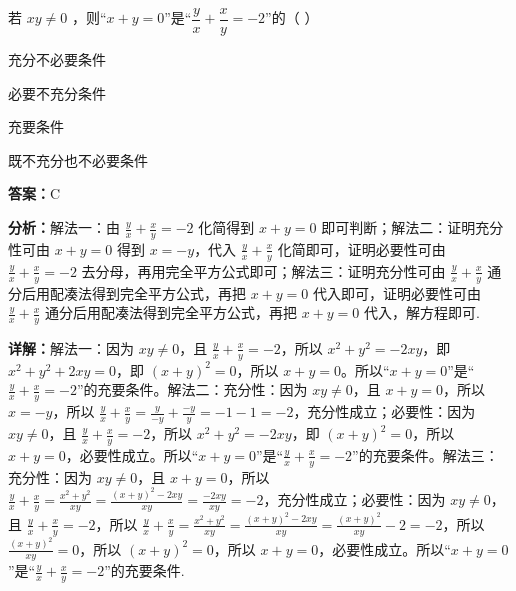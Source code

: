 \begin{question}[points=4]
若 $xy \neq 0$ ，则“$x + y = 0$”是“$\dfrac{y}{x} + \dfrac{x}{y} = -2$”的（ ）
\begin{choices}
  \item 充分不必要条件
  \item 必要不充分条件
  \item 充要条件
  \item 既不充分也不必要条件
\end{choices}
\begin{solution}
\textbf{答案：}C

\textbf{分析：}解法一：由 $\frac{y}{x} + \frac{x}{y} = -2$ 化简得到 $x+y=0$ 即可判断；解法二：证明充分性可由 $x+y=0$ 得到 $x=-y$，代入 $\frac{y}{x}+\frac{x}{y}$ 化简即可，证明必要性可由 $\frac{y}{x}+\frac{x}{y}=-2$ 去分母，再用完全平方公式即可；解法三：证明充分性可由 $\frac{y}{x}+\frac{x}{y}$ 通分后用配凑法得到完全平方公式，再把 $x+y=0$ 代入即可，证明必要性可由 $\frac{y}{x}+\frac{x}{y}$ 通分后用配凑法得到完全平方公式，再把 $x+y=0$ 代入，解方程即可.

\textbf{详解：}解法一：因为 $xy \neq 0$，且 $\frac{y}{x}+\frac{x}{y} = -2$，所以 $x^2+y^2 = -2xy$，即 $x^2+y^2+2xy=0$，即 $(x+y)^2=0$，所以 $x+y=0$。所以“$x+y=0$”是“$\frac{y}{x}+\frac{x}{y}=-2$”的充要条件。解法二：充分性：因为 $xy \neq 0$，且 $x+y=0$，所以 $x=-y$，所以 $\frac{y}{x}+\frac{x}{y} = \frac{y}{-y}+\frac{-y}{y} = -1-1 = -2$，充分性成立；必要性：因为 $xy \neq 0$，且 $\frac{y}{x}+\frac{x}{y} = -2$，所以 $x^2+y^2 = -2xy$，即 $(x+y)^2=0$，所以 $x+y=0$，必要性成立。所以“$x+y=0$”是“$\frac{y}{x}+\frac{x}{y}=-2$”的充要条件。解法三：充分性：因为 $xy \neq 0$，且 $x+y=0$，所以 $\frac{y}{x}+\frac{x}{y} = \frac{x^2+y^2}{xy} = \frac{(x+y)^2-2xy}{xy} = \frac{-2xy}{xy} = -2$，充分性成立；必要性：因为 $xy \neq 0$，且 $\frac{y}{x}+\frac{x}{y} = -2$，所以 $\frac{y}{x}+\frac{x}{y} = \frac{x^2+y^2}{xy} = \frac{(x+y)^2-2xy}{xy} = \frac{(x+y)^2}{xy} - 2 = -2$，所以 $\frac{(x+y)^2}{xy} = 0$，所以 $(x+y)^2=0$，所以 $x+y=0$，必要性成立。所以“$x+y=0$”是“$\frac{y}{x}+\frac{x}{y}=-2$”的充要条件.
\end{solution}
\end{question}

